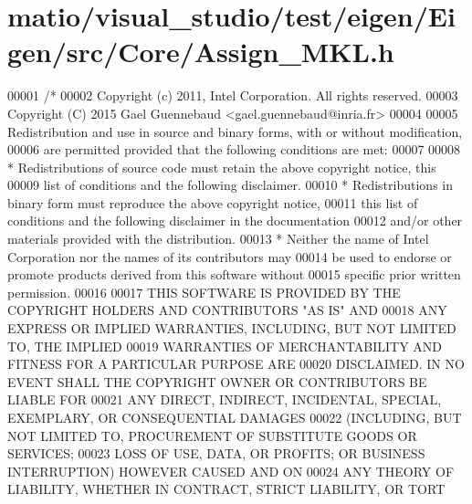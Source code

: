 \hypertarget{matio_2visual__studio_2test_2eigen_2_eigen_2src_2_core_2_assign___m_k_l_8h_source}{}\section{matio/visual\+\_\+studio/test/eigen/\+Eigen/src/\+Core/\+Assign\+\_\+\+M\+KL.h}
\label{matio_2visual__studio_2test_2eigen_2_eigen_2src_2_core_2_assign___m_k_l_8h_source}

\begin{DoxyCode}
00001 \textcolor{comment}{/*}
00002 \textcolor{comment}{ Copyright (c) 2011, Intel Corporation. All rights reserved.}
00003 \textcolor{comment}{ Copyright (C) 2015 Gael Guennebaud <gael.guennebaud@inria.fr>}
00004 \textcolor{comment}{ }
00005 \textcolor{comment}{ Redistribution and use in source and binary forms, with or without modification,}
00006 \textcolor{comment}{ are permitted provided that the following conditions are met:}
00007 \textcolor{comment}{}
00008 \textcolor{comment}{ * Redistributions of source code must retain the above copyright notice, this}
00009 \textcolor{comment}{   list of conditions and the following disclaimer.}
00010 \textcolor{comment}{ * Redistributions in binary form must reproduce the above copyright notice,}
00011 \textcolor{comment}{   this list of conditions and the following disclaimer in the documentation}
00012 \textcolor{comment}{   and/or other materials provided with the distribution.}
00013 \textcolor{comment}{ * Neither the name of Intel Corporation nor the names of its contributors may}
00014 \textcolor{comment}{   be used to endorse or promote products derived from this software without}
00015 \textcolor{comment}{   specific prior written permission.}
00016 \textcolor{comment}{}
00017 \textcolor{comment}{ THIS SOFTWARE IS PROVIDED BY THE COPYRIGHT HOLDERS AND CONTRIBUTORS "AS IS" AND}
00018 \textcolor{comment}{ ANY EXPRESS OR IMPLIED WARRANTIES, INCLUDING, BUT NOT LIMITED TO, THE IMPLIED}
00019 \textcolor{comment}{ WARRANTIES OF MERCHANTABILITY AND FITNESS FOR A PARTICULAR PURPOSE ARE}
00020 \textcolor{comment}{ DISCLAIMED. IN NO EVENT SHALL THE COPYRIGHT OWNER OR CONTRIBUTORS BE LIABLE FOR}
00021 \textcolor{comment}{ ANY DIRECT, INDIRECT, INCIDENTAL, SPECIAL, EXEMPLARY, OR CONSEQUENTIAL DAMAGES}
00022 \textcolor{comment}{ (INCLUDING, BUT NOT LIMITED TO, PROCUREMENT OF SUBSTITUTE GOODS OR SERVICES;}
00023 \textcolor{comment}{ LOSS OF USE, DATA, OR PROFITS; OR BUSINESS INTERRUPTION) HOWEVER CAUSED AND ON}
00024 \textcolor{comment}{ ANY THEORY OF LIABILITY, WHETHER IN CONTRACT, STRICT LIABILITY, OR TORT}

\end{DoxyCode}

